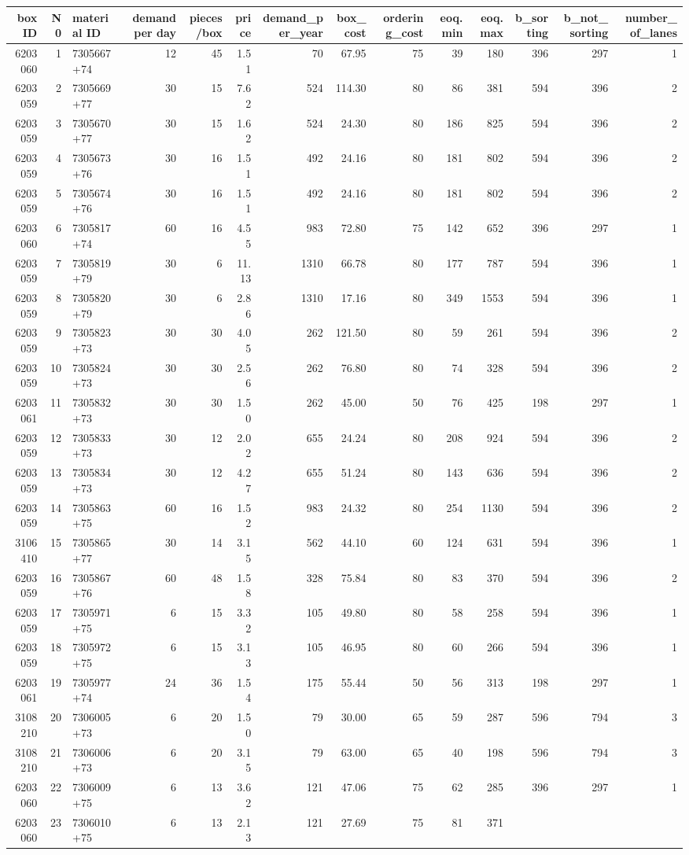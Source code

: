 \documentclass[
]{article}
\begin{document}
\begin{longtable}[]{@{}rrlrrrrrrrrrrr@{}}
\toprule
box ID & N0 & material ID & demand per day & pieces/box & price &
demand\_per\_year & box\_cost & ordering\_cost & eoq.min & eoq.max &
b\_sorting & b\_not\_sorting & number\_of\_lanes\tabularnewline
\midrule
\endhead
6203060 & 1 & 7305667+74 & 12 & 45 & 1.51 & 70 & 67.95 & 75 & 39 & 180 &
396 & 297 & 1\tabularnewline
6203059 & 2 & 7305669+77 & 30 & 15 & 7.62 & 524 & 114.30 & 80 & 86 & 381
& 594 & 396 & 2\tabularnewline
6203059 & 3 & 7305670+77 & 30 & 15 & 1.62 & 524 & 24.30 & 80 & 186 & 825
& 594 & 396 & 2\tabularnewline
6203059 & 4 & 7305673+76 & 30 & 16 & 1.51 & 492 & 24.16 & 80 & 181 & 802
& 594 & 396 & 2\tabularnewline
6203059 & 5 & 7305674+76 & 30 & 16 & 1.51 & 492 & 24.16 & 80 & 181 & 802
& 594 & 396 & 2\tabularnewline
6203060 & 6 & 7305817+74 & 60 & 16 & 4.55 & 983 & 72.80 & 75 & 142 & 652
& 396 & 297 & 1\tabularnewline
6203059 & 7 & 7305819+79 & 30 & 6 & 11.13 & 1310 & 66.78 & 80 & 177 &
787 & 594 & 396 & 1\tabularnewline
6203059 & 8 & 7305820+79 & 30 & 6 & 2.86 & 1310 & 17.16 & 80 & 349 &
1553 & 594 & 396 & 1\tabularnewline
6203059 & 9 & 7305823+73 & 30 & 30 & 4.05 & 262 & 121.50 & 80 & 59 & 261
& 594 & 396 & 2\tabularnewline
6203059 & 10 & 7305824+73 & 30 & 30 & 2.56 & 262 & 76.80 & 80 & 74 & 328
& 594 & 396 & 2\tabularnewline
6203061 & 11 & 7305832+73 & 30 & 30 & 1.50 & 262 & 45.00 & 50 & 76 & 425
& 198 & 297 & 1\tabularnewline
6203059 & 12 & 7305833+73 & 30 & 12 & 2.02 & 655 & 24.24 & 80 & 208 &
924 & 594 & 396 & 2\tabularnewline
6203059 & 13 & 7305834+73 & 30 & 12 & 4.27 & 655 & 51.24 & 80 & 143 &
636 & 594 & 396 & 2\tabularnewline
6203059 & 14 & 7305863+75 & 60 & 16 & 1.52 & 983 & 24.32 & 80 & 254 &
1130 & 594 & 396 & 2\tabularnewline
3106410 & 15 & 7305865+77 & 30 & 14 & 3.15 & 562 & 44.10 & 60 & 124 &
631 & 594 & 396 & 1\tabularnewline
6203059 & 16 & 7305867+76 & 60 & 48 & 1.58 & 328 & 75.84 & 80 & 83 & 370
& 594 & 396 & 2\tabularnewline
6203059 & 17 & 7305971+75 & 6 & 15 & 3.32 & 105 & 49.80 & 80 & 58 & 258
& 594 & 396 & 1\tabularnewline
6203059 & 18 & 7305972+75 & 6 & 15 & 3.13 & 105 & 46.95 & 80 & 60 & 266
& 594 & 396 & 1\tabularnewline
6203061 & 19 & 7305977+74 & 24 & 36 & 1.54 & 175 & 55.44 & 50 & 56 & 313
& 198 & 297 & 1\tabularnewline
3108210 & 20 & 7306005+73 & 6 & 20 & 1.50 & 79 & 30.00 & 65 & 59 & 287 &
596 & 794 & 3\tabularnewline
3108210 & 21 & 7306006+73 & 6 & 20 & 3.15 & 79 & 63.00 & 65 & 40 & 198 &
596 & 794 & 3\tabularnewline
6203060 & 22 & 7306009+75 & 6 & 13 & 3.62 & 121 & 47.06 & 75 & 62 & 285
& 396 & 297 & 1\tabularnewline
6203060 & 23 & 7306010+75 & 6 & 13 & 2.13 & 121 & 27.69 & 75 & 81 & 371

\end{longtable}
\end{document}
